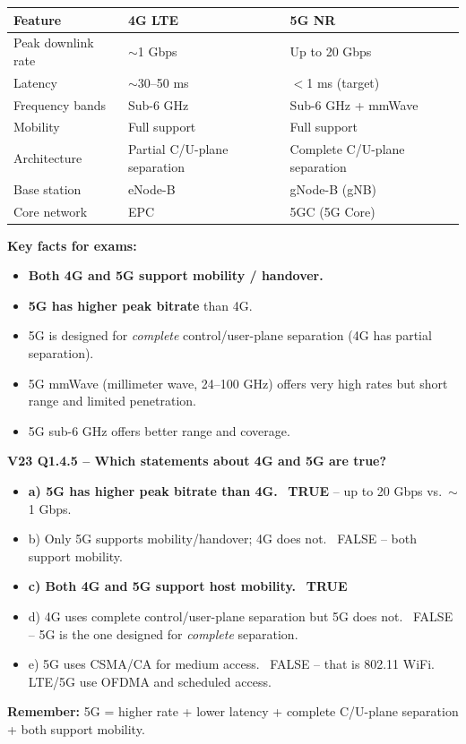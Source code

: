 \begin{keybox}
\begin{center}
\begin{tabular}{lll}
\toprule
\textbf{Feature} & \textbf{4G LTE} & \textbf{5G NR} \\
\midrule
Peak downlink rate & $\sim$1 Gbps & Up to 20 Gbps \\
Latency & $\sim$30--50 ms & $<$1 ms (target) \\
Frequency bands & Sub-6 GHz & Sub-6 GHz + mmWave \\
Mobility & Full support & Full support \\
Architecture & Partial C/U-plane separation & Complete C/U-plane separation \\
Base station & eNode-B & gNode-B (gNB) \\
Core network & EPC & 5GC (5G Core) \\
\bottomrule
\end{tabular}
\end{center}

\medskip
\textbf{Key facts for exams:}
\begin{itemize}[noitemsep]
    \item \textbf{Both 4G and 5G support mobility / handover.}
    \item \textbf{5G has higher peak bitrate} than 4G.
    \item 5G is designed for \emph{complete} control/user-plane separation (4G has partial separation).
    \item 5G mmWave (millimeter wave, 24--100 GHz) offers very high rates but short range and limited penetration.
    \item 5G sub-6 GHz offers better range and coverage.
\end{itemize}
\end{keybox}

\begin{exambox}
\textbf{V23 Q1.4.5 -- Which statements about 4G and 5G are true?}
\begin{itemize}[noitemsep]
    \item \textbf{a) 5G has higher peak bitrate than 4G.} \checkmark\ \textbf{TRUE} -- up to 20 Gbps vs.\ $\sim$1 Gbps.
    \item b) Only 5G supports mobility/handover; 4G does not. \texttimes\ FALSE -- both support mobility.
    \item \textbf{c) Both 4G and 5G support host mobility.} \checkmark\ \textbf{TRUE}
    \item d) 4G uses complete control/user-plane separation but 5G does not. \texttimes\ FALSE -- 5G is the one designed for \emph{complete} separation.
    \item e) 5G uses CSMA/CA for medium access. \texttimes\ FALSE -- that is 802.11 WiFi. LTE/5G use OFDMA and scheduled access.
\end{itemize}

\medskip
\textbf{Remember:} 5G = higher rate + lower latency + complete C/U-plane separation + both support mobility.
\end{exambox}

